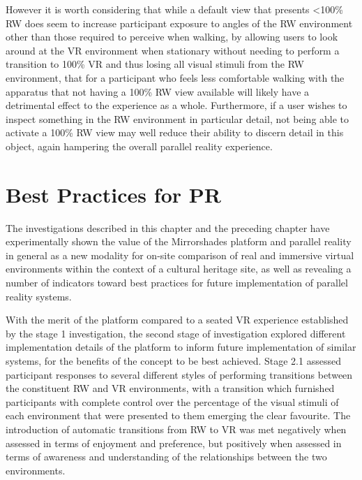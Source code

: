 However it is worth considering that while a default view that presents \textless 100\% RW does seem to increase participant exposure to angles of the RW environment other than those required to perceive when walking, by allowing users to look around at the VR environment when stationary without needing to perform a transition to 100\% VR and thus losing all visual stimuli from the RW environment, that for a participant who feels less comfortable walking with the apparatus that not having a 100\% RW view available will likely have a detrimental effect to the experience as a whole. Furthermore, if a user wishes to inspect something in the RW environment in particular detail, not being able to activate a 100\% RW view may well reduce their ability to discern detail in this object, again hampering the overall parallel reality experience.


\section{Best Practices for PR}

The investigations described in this chapter and the preceding chapter have experimentally shown the value of the Mirrorshades platform and parallel reality in general as a new modality for on-site comparison of real and immersive virtual environments within the context of a cultural heritage site, as well as revealing a number of indicators toward best practices for future implementation of parallel reality systems.

With the merit of the platform compared to a seated VR experience established by the stage 1 investigation, the second stage of investigation explored different implementation details of the platform to inform future implementation of similar systems, for the benefits of the concept to be best achieved. Stage 2.1 assessed participant responses to several different styles of performing transitions between the constituent RW and VR environments, with a transition which furnished participants with complete control over the percentage of the visual stimuli of each environment that were presented to them emerging the clear favourite. The introduction of automatic transitions from RW to VR was met negatively when assessed in terms of enjoyment and preference, but positively when assessed in terms of awareness and understanding of the relationships between the two environments.

